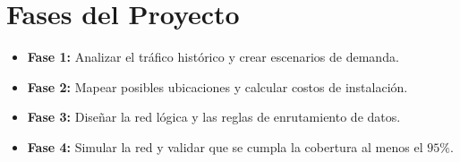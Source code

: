 \documentclass[11s,a4paper]{article}
\begin{document}
\section{Fases del Proyecto}
\begin{itemize}
\item \textbf{Fase 1:} Analizar el tráfico histórico y crear escenarios de demanda.
\item \textbf{Fase 2:} Mapear posibles ubicaciones y calcular costos de instalación.
\item \textbf{Fase 3:} Diseñar la red lógica y las reglas de enrutamiento de datos.
\item \textbf{Fase 4:} Simular la red y validar que se cumpla la cobertura al menos el $95\%$.
\end{itemize}
\end{document}
